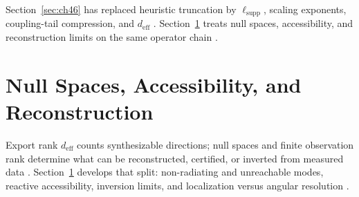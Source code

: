 Section~\ref{sec:ch46} has replaced heuristic truncation by \(\ell_{\mathrm{supp}}\), scaling exponents, coupling-tail compression, and
\(d_{\mathrm{eff}}\) \cite{stratton1941,hansen1988,harrington2001}. Section~\ref{sec:ch47} treats null spaces, accessibility, and
reconstruction limits on the same operator chain \cite{devaney2004}.


\section{Null Spaces, Accessibility, and Reconstruction}
\label{sec:ch47}

Export rank \(d_{\mathrm{eff}}\) counts synthesizable directions; null spaces and finite observation rank determine what can be
reconstructed, certified, or inverted from measured data \cite{stratton1941,harrington2001,devaney2004}. Section~\ref{sec:ch47}
develops that split: non-radiating and unreachable modes, reactive accessibility, inversion limits, and localization versus angular
resolution \cite{hansen1988}.
